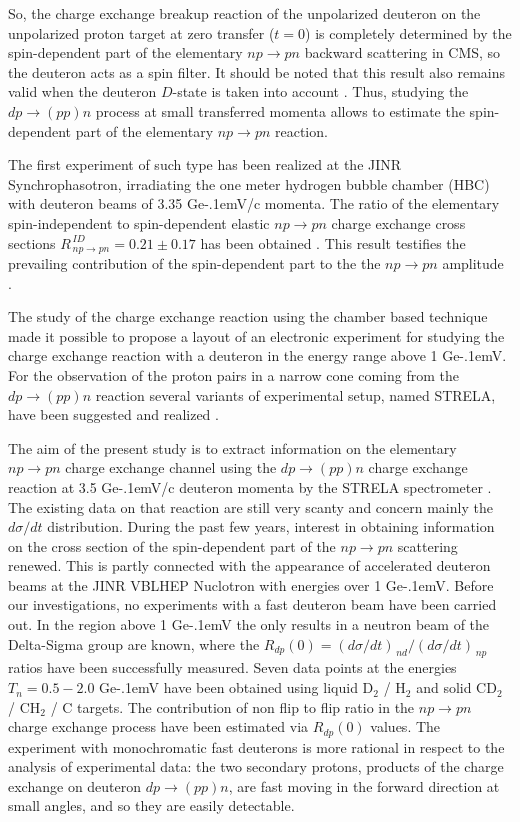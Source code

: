 \documentclass[twocolumn,epjc3]{svjour3}
\newcommand{\np}     {\ensuremath{np \rightarrow pn}\xspace}
\newcommand{\dpchex} {\ensuremath{dp \rightarrow (pp)n}\xspace}
\newcommand{\GeVc}   {Ge\kern-.1emV/c\xspace}
\newcommand{\GeV}    {Ge\kern-.1emV\xspace}
\begin{document}
So, the charge exchange breakup reaction of the unpolarized deuteron on the
unpolarized proton target at zero transfer ($t = 0$) is completely determined by
the spin-dependent part of the elementary \np backward scattering in CMS, so the
deuteron acts as a spin filter. It should be noted that this result also remains
valid when the deuteron $D$-state is taken into account \cite{led04}. Thus,
studying the \dpchex process at small transferred momenta allows to estimate the
spin-dependent part of the elementary \np reaction.

The first experiment of such type has been realized at the JINR
Synchrophasotron, irradiating the one meter hydrogen bubble chamber (HBC) with
deuteron beams of 3.35 \GeVc momenta. The ratio of the elementary
spin-independent to spin-dependent elastic \np charge exchange cross sections
$R^{\,ID}_{\,\np} = 0.21 \pm 0.17$ has been obtained \cite{gla08}. This result
testifies the prevailing contribution of the spin-dependent part to the the \np
amplitude \cite{gla02,gla08}.

The study of the charge exchange reaction using the chamber based technique made
it possible to propose a layout of an electronic experiment for studying the
charge exchange reaction with a deuteron in the energy range above 1 \GeV. For
the observation of the proton pairs in a narrow cone coming from the \dpchex
reaction several variants of experimental setup, named STRELA, have been
suggested and realized \cite{gla13}.

The aim of the present study is to extract information on the elementary \np
charge exchange channel using the \dpchex charge exchange reaction at 3.5 \GeVc
deuteron momenta by the STRELA spectrometer \cite{gla13}. The existing data on
that reaction are still very scanty and concern mainly the $d\sigma/dt$
distribution. During the past few years, interest in obtaining information on
the cross section of the spin-dependent part of the \np scattering renewed. This
is partly connected with the appearance of accelerated deuteron beams at the
JINR VBLHEP Nuclotron with energies over 1 \GeV. Before our investigations, no
experiments with a fast deuteron beam have been carried out. In the region above
1 \GeV the only results in a neutron beam of the Delta-Sigma group
\cite{sha09,sha09_2,shi11} are known, where the
$R_{dp}(0) = (d\sigma/dt)_{\,nd} / (d\sigma/dt)_{\,np}$ ratios have been
successfully measured. Seven data points at the energies $T_n = 0.5 - 2.0$ \GeV
have been obtained using liquid D$_2$ / H$_2$ and solid CD$_2$ / CH$_2$ / C
targets. The contribution of non flip to flip ratio in the \np charge exchange
process have been estimated via $R_{dp}(0)$ values. The experiment with
monochromatic fast deuterons is more rational in respect to the analysis of
experimental data: the two secondary protons, products of the charge exchange on
deuteron \dpchex, are fast moving in the forward direction at small angles, and
so they are easily detectable.
\end{document}
